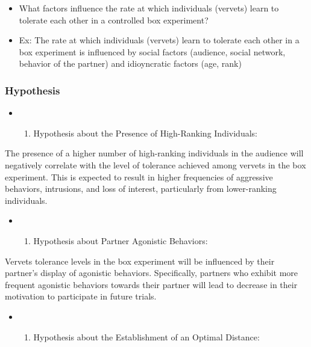 \documentclass[
]{article}
\providecommand{\tightlist}{%
  \setlength{\itemsep}{0pt}\setlength{\parskip}{0pt}}
\begin{document}
\begin{itemize}
\item
  What factors influence the rate at which individuals (vervets) learn
  to tolerate each other in a controlled box experiment?
\item
  Ex: The rate at which individuals (vervets) learn to tolerate each
  other in a box experiment is influenced by social factors (audience,
  social network, behavior of the partner) and idioyncratic factors
  (age, rank)
\end{itemize}

\hypertarget{hypothesis}{%
\subsubsection{Hypothesis}\label{hypothesis}}

\begin{itemize}
\item
  \begin{enumerate}
  \def\labelenumi{\arabic{enumi}.}
  \tightlist
  \item
    Hypothesis about the Presence of High-Ranking Individuals:
  \end{enumerate}
\end{itemize}

The presence of a higher number of high-ranking individuals in the
audience will negatively correlate with the level of tolerance achieved
among vervets in the box experiment. This is expected to result in
higher frequencies of aggressive behaviors, intrusions, and loss of
interest, particularly from lower-ranking individuals.

\begin{itemize}
\item
  \begin{enumerate}
  \def\labelenumi{\arabic{enumi}.}
  \setcounter{enumi}{1}
  \tightlist
  \item
    Hypothesis about Partner Agonistic Behaviors:
  \end{enumerate}
\end{itemize}

Vervets tolerance levels in the box experiment will be influenced by
their partner's display of agonistic behaviors. Specifically, partners
who exhibit more frequent agonistic behaviors towards their partner will
lead to decrease in their motivation to participate in future trials.

\begin{itemize}
\item
  \begin{enumerate}
  \def\labelenumi{\arabic{enumi}.}
  \setcounter{enumi}{2}
  \tightlist
  \item
    Hypothesis about the Establishment of an Optimal Distance:
  \end{enumerate}
\end{itemize}
\end{document}
